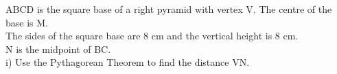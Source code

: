 \documentclass[preview]{standalone}
\begin{document}
\begin{center}
\begin{minipage}{12cm}\raggedright ABCD is the square base of a right pyramid with vertex V. The centre of the base is M.\\ The sides of the square base are 8 cm and the vertical height is 8 cm.\\ N is the midpoint of BC.\\ i) Use the Pythagorean Theorem to find the distance VN.\end{minipage}
\end{center}
\end{document}
